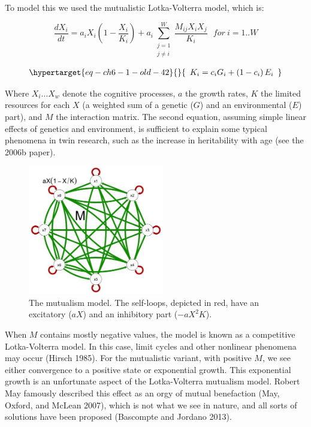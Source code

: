 \documentclass[
  letterpaper,
]{scrbook}
\begin{document}
To model this we used the mutualistic Lotka-Volterra model, which is:

\[\frac{dX_{i}}{dt} = a_{i}X_{i}\left( 1 - \frac{X_{i}}{K_{i}} \right) + a_{i}\sum_{\begin{array}{r}
j = 1 \\
j \neq i
\end{array}}^{W}\frac{M_{ij}X_{i}X_{j}}{K_{i}}\ \ \ for\ i = 1..W\]

\begin{equation}\protect\hypertarget{eq-ch6-1-old-42}{}{\begin{array}{r}
K_{i} = c_{i}G_{i} + \left( 1 - c_{i} \right)E_{i}
\end{array}}\label{eq-ch6-1-old-42}\end{equation}

Where \(X_{i} \ldots X_{w}\) denote the cognitive processes, \(a\) the
growth rates, \(K\) the limited resources for each \(X\) (a weighted sum
of a genetic (\(G\)) and an environmental (\(E\)) part), and \(M\) the
interaction matrix. The second equation, assuming simple linear effects
of genetics and environment, is sufficient to explain some typical
phenomena in twin research, such as the increase in heritability with
age (see the 2006b paper).

\begin{figure}

{\centering \includegraphics[width=2.33386in,height=\textheight]{media/ch6/image6.jpg}

}

\caption{\label{fig-ch6-img6-old-75}The mutualism model. The self-loops,
depicted in red, have an excitatory (\(aX\)) and an inhibitory part
(\(- aX^{2}K\)).}

\end{figure}

When \(M\) contains mostly negative values, the model is known as a
competitive Lotka-Volterra model. In this case, limit cycles and other
nonlinear phenomena may occur (Hirsch 1985). For the mutualistic
variant, with positive \(M\), we see either convergence to a positive
state or exponential growth. This exponential growth is an unfortunate
aspect of the Lotka-Volterra mutualism model. Robert May famously
described this effect as an orgy of mutual benefaction (May, Oxford, and
McLean 2007), which is not what we see in nature, and all sorts of
solutions have been proposed (Bascompte and Jordano 2013).
\end{document}
